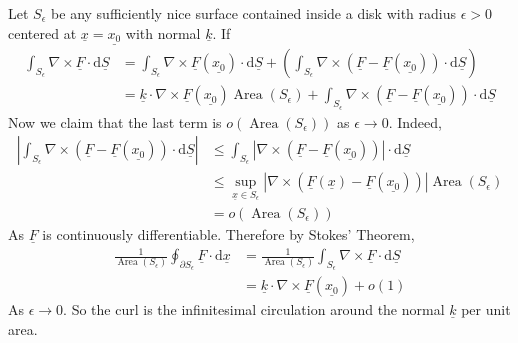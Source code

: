 \begin{example}
    Let $S_{\epsilon}$ be any sufficiently nice surface contained inside a disk with radius $\epsilon>0$ centered at $\underline{x}=\underline{x_0}$ with normal $\underline{k}$.
    If
    \begin{align*}
        \int_{S_\epsilon}\nabla\times\underline{F}\cdot\mathrm d\underline{S}&=\int_{S_\epsilon}\nabla\times\underline{F}(\underline{x_0})\cdot\mathrm d\underline{S}+\left( \int_{S_\epsilon}\nabla\times(\underline{F}-\underline{F}(\underline{x_0}))\cdot\mathrm d\underline{S} \right)
        \\
        &=\underline{k}\cdot\nabla\times\underline{F}(\underline{x_0})\operatorname{Area}(S_\epsilon)+\int_{S_\epsilon}\nabla\times(\underline{F}-\underline{F}(\underline{x_0}))\cdot\mathrm d\underline{S}
    \end{align*}
    Now we claim that the last term is $o(\operatorname{Area}(S_\epsilon))$ as $\epsilon\to 0$.
    Indeed,
    \begin{align*}
        \left| \int_{S_\epsilon}\nabla\times(\underline{F}-\underline{F}(\underline{x_0}))\cdot\mathrm d\underline{S} \right|
        &\le\int_{S_\epsilon}|\nabla\times(\underline{F}-\underline{F}(\underline{x_0}))|\cdot\mathrm d\underline{S}\\
        &\le\sup_{\underline{x}\in S_\epsilon}|\nabla\times(\underline{F}(\underline{x})-\underline{F}(\underline{x_0}))|\operatorname{Area}(S_\epsilon)\\
        &=o(\operatorname{Area}(S_\epsilon))
    \end{align*}
    As $\underline{F}$ is continuously differentiable.
    Therefore by Stokes' Theorem,
    \begin{align*}
        \frac{1}{\operatorname{Area}(S_\epsilon)}\oint_{\partial S_\epsilon}\underline{F}\cdot\mathrm d\underline{x}
        &=\frac{1}{\operatorname{Area}(S_\epsilon)}\int_{S_\epsilon}\nabla\times\underline{F}\cdot\mathrm d\underline{S}\\
        &=\underline{k}\cdot\nabla\times\underline{F}(\underline{x_0})+o(1)
    \end{align*}
    As $\epsilon\to 0$.
    So the curl is the infinitesimal circulation around the normal $\underline{k}$ per unit area.
\end{example}